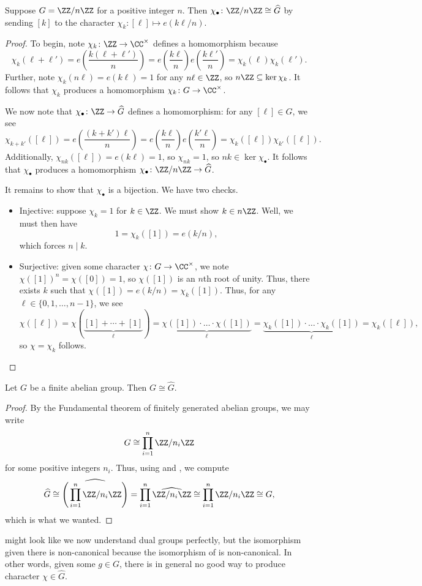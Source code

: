 \documentclass[../notes.tex]{subfiles}
\begin{document}
\begin{lemma} \label{lem:cyclic-dual}
	Suppose $G=\ZZ/n\ZZ$ for a positive integer $n$. Then $\chi_\bullet\colon\ZZ/n\ZZ\cong \widehat{G}$ by sending $[k]$ to the character $\chi_k\colon[\ell]\mapsto e(k\ell/n)$.
\end{lemma}
\begin{proof}
	To begin, note $\chi_k\colon\ZZ\to\CC^\times$ defines a homomorphism because
	\[\chi_k(\ell+\ell')=e\left(\frac{k(\ell+\ell')}n\right)=e\left(\frac{k\ell}n\right)e\left(\frac{k\ell'}n\right)=\chi_k(\ell)\chi_k(\ell').\]
	Further, note $\chi_k(n\ell)=e(k\ell)=1$ for any $n\ell\in\ZZ$, so $n\ZZ\subseteq\ker\chi_k$. It follows that $\chi_k$ produces a homomorphism $\chi_k\colon G\to\CC^\times$.

	We now note that $\chi_\bullet\colon\ZZ\to \widehat{G}$ defines a homomorphism: for any $[\ell]\in G$, we see
	\[\chi_{k+k'}([\ell])=e\left(\frac{(k+k')\ell}n\right)=e\left(\frac{k\ell}n\right)e\left(\frac{k'\ell}n\right)=\chi_k([\ell])\chi_{k'}([\ell]).\]
	Additionally, $\chi_{nk}([\ell])=e(k\ell)=1$, so $\chi_{nk}=1$, so $nk\in\ker\chi_\bullet$. It follows that $\chi_\bullet$ produces a homomorphism $\chi_\bullet\colon\ZZ/n\ZZ\to \widehat{G}$.

	It remains to show that $\chi_\bullet$ is a bijection. We have two checks.
	\begin{itemize}
		\item Injective: suppose $\chi_k=1$ for $k\in\ZZ$. We must show $k\in n\ZZ$. Well, we must then have
		\[1=\chi_k([1])=e(k/n),\]
		which forces $n\mid k$.
		\item Surjective: given some character $\chi\colon G\to\CC^\times$, we note $\chi([1])^n=\chi([0])=1$, so $\chi([1])$ is an $n$th root of unity. Thus, there exists $k$ such that $\chi([1])=e(k/n)=\chi_k([1])$. Thus, for any $\ell\in\{0,1,\ldots,n-1\}$, we see
		\[\chi([\ell])=\chi(\underbrace{[1]+\cdots+[1]}_\ell)=\underbrace{\chi([1])\cdot\ldots\cdot\chi([1])}_\ell=\underbrace{\chi_k([1])\cdot\ldots\cdot\chi_k([1])}_\ell=\chi_k([\ell]),\]
		so $\chi=\chi_k$ follows.
		\qedhere
	\end{itemize}
\end{proof}
\begin{proposition} \label{prop:g-cong-g-dual}
	Let $G$ be a finite abelian group. Then $G\cong \widehat{G}$.
\end{proposition}
\begin{proof}
	By the Fundamental theorem of finitely generated abelian groups, we may write
	\[G\cong\prod_{i=1}^n\ZZ/n_i\ZZ\]
	for some positive integers $n_i$. Thus, using  and , we compute
	\[\widehat{G}\cong\widehat{\Bigg(\prod_{i=1}^n\ZZ/n_i\ZZ\Bigg)}=\prod_{i=1}^n\widehat{\ZZ/n_i\ZZ}\cong\prod_{i=1}^n\ZZ/n_i\ZZ\cong G,\]
	which is what we wanted.
\end{proof}
 might look like we now understand dual groups perfectly, but the isomorphism given there is non-canonical because the isomorphism of  is non-canonical. In other words, given some $g\in G$, there is in general no good way to produce character $\chi\in \widehat{G}$.
\end{document}
